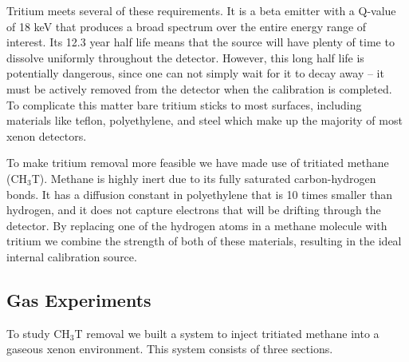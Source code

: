 \documentclass[a4paper,12pt]{article}
\begin{document}
Tritium meets several of these requirements.  It is a beta emitter with a Q-value of 18 keV that produces a broad spectrum over the entire energy range of interest.  Its 12.3 year half life means that the source will have plenty of time to dissolve uniformly throughout the detector.  However, this long half life is potentially dangerous, since one can not simply wait for it to decay away -- it must be actively removed from the detector when the calibration is completed.  To complicate this matter bare tritium sticks to most surfaces, including materials like teflon, polyethylene, and steel which make up the majority of most xenon detectors.

To make tritium removal more feasible we have made use of tritiated methane (CH$_3$T).  Methane is highly inert due to its fully saturated carbon-hydrogen bonds.  It has a diffusion constant in polyethylene that is 10 times smaller than hydrogen, and it does not capture electrons that will be drifting through the detector.  By replacing one of the hydrogen atoms in a methane molecule with tritium we combine the strength of both of these materials, resulting in the ideal internal calibration source.


\subsection{Gas Experiments}

To study CH$_3$T removal we built a system to inject tritiated methane into a gaseous xenon environment.  This system consists of three sections. 
\end{document}
